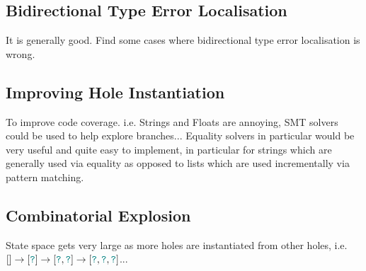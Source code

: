 \subsection{Bidirectional Type Error Localisation}
It is generally good. Find some cases where bidirectional type error localisation is wrong.
\subsection{Improving Hole Instantiation}
To improve code coverage. i.e. Strings and Floats are annoying, SMT solvers could be used to help explore branches... Equality solvers in particular would be very useful and quite easy to implement, in particular for strings which are generally used via equality as opposed to lists which are used incrementally via pattern matching.
\subsection{Combinatorial Explosion}
State space gets very large as more holes are instantiated from other holes, i.e. $[] \to [{\color{teal}\texttt{?}}] \to [{\color{teal}\texttt{?}}, {\color{teal}\texttt{?}}] \to [{\color{teal}\texttt{?}},{\color{teal}\texttt{?}},{\color{teal}\texttt{?}}]$...
